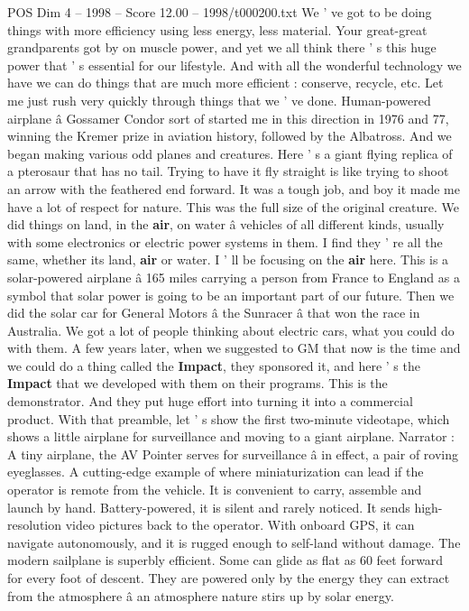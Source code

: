 \begin{textsample}{POS Dim 4 – 1998 – Score 12.00 – 1998/t000200.txt}
We ' ve got to be doing things with more efficiency using less energy, less material.
Your great-great grandparents got by on muscle power, and yet we all think there ' s this huge power that ' s essential for our lifestyle.
And with all the wonderful technology we have we can do things that are much more efficient : conserve, recycle, etc.
Let me just rush very quickly through things that we ' ve done.
Human-powered airplane â Gossamer Condor sort of started me in this direction in 1976 and 77, winning the Kremer prize in aviation history, followed by the Albatross.
And we began making various odd planes and creatures.
Here ' s a giant flying replica of a pterosaur that has no tail.
Trying to have it fly straight is like trying to shoot an arrow with the feathered end forward.
It was a tough job, and boy it made me have a lot of respect for nature.
This was the full size of the original creature.
We did things on land, in the \textbf{air}, on water â vehicles of all different kinds, usually with some electronics or electric power systems in them.
I find they ' re all the same, whether its land, \textbf{air} or water.
I ' ll be focusing on the \textbf{air} here.
This is a solar-powered airplane â 165 miles carrying a person from France to England as a symbol that solar power is going to be an important part of our future.
Then we did the solar car for General Motors â the Sunracer â that won the race in Australia.
We got a lot of people thinking about electric cars, what you could do with them.
A few years later, when we suggested to GM that now is the time and we could do a thing called the \textbf{Impact}, they sponsored it, and here ' s the \textbf{Impact} that we developed with them on their programs.
This is the demonstrator.
And they put huge effort into turning it into a commercial product.
With that preamble, let ' s show the first two-minute videotape, which shows a little airplane for surveillance and moving to a giant airplane.
Narrator : A tiny airplane, the AV Pointer serves for surveillance â in effect, a pair of roving eyeglasses.
A cutting-edge example of where miniaturization can lead if the operator is remote from the vehicle.
It is convenient to carry, assemble and launch by hand.
Battery-powered, it is silent and rarely noticed.
It sends high-resolution video pictures back to the operator.
With onboard GPS, it can navigate autonomously, and it is rugged enough to self-land without damage.
The modern sailplane is superbly efficient.
Some can glide as flat as 60 feet forward for every foot of descent.
They are powered only by the energy they can extract from the atmosphere â an atmosphere nature stirs up by solar energy.

\end{textsample}
